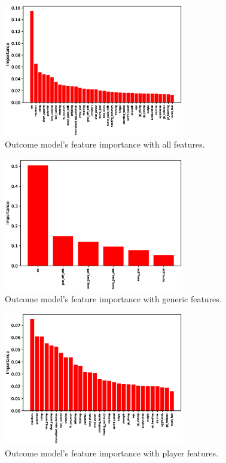 \begin{figure}[H]
    \centering
    \includegraphics[width=0.7\textwidth]{img/match_level_2018_outcome_feature_importance_af_feature_importance.eps}
    \caption{Outcome model's feature importance with all features.}
    \label{fig:outcome_feature_importance_af}
\end{figure}

\begin{figure}[H]
    \centering
    \includegraphics[width=0.7\textwidth]{img/match_level_2018_outcome_feature_importance_gf_feature_importance.eps}
    \caption{Outcome model's feature importance with generic features.}
    \label{fig:outcome_feature_importance_gf}
\end{figure}

\begin{figure}[H]
    \centering
    \includegraphics[width=0.7\textwidth]{img/match_level_2018_outcome_feature_importance_pf_feature_importance.eps}
    \caption{Outcome model's feature importance with player features.}
    \label{fig:outcome_feature_importance_pf}
\end{figure}

